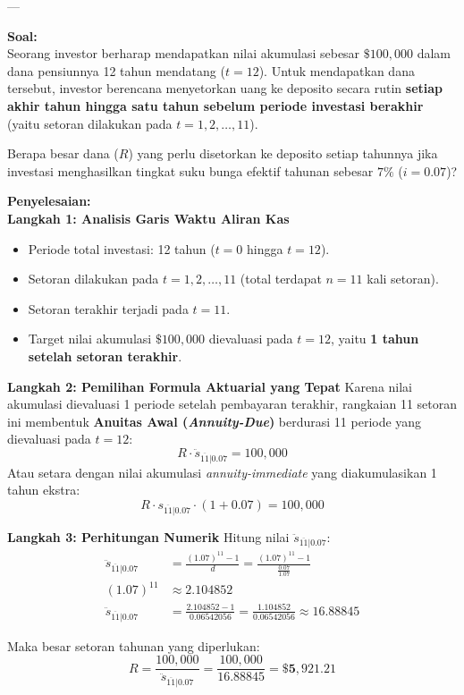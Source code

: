 \documentclass[11pt,a4paper]{article}
\begin{document}
---

\begin{examplebox}
\textbf{Soal:}\\
Seorang investor berharap mendapatkan nilai akumulasi sebesar $\$100{,}000$ dalam dana pensiunnya 12 tahun mendatang ($t = 12$). Untuk mendapatkan dana tersebut, investor berencana menyetorkan uang ke deposito secara rutin \textbf{setiap akhir tahun hingga satu tahun sebelum periode investasi berakhir} (yaitu setoran dilakukan pada $t = 1, 2, \dots, 11$).

Berapa besar dana ($R$) yang perlu disetorkan ke deposito setiap tahunnya jika investasi menghasilkan tingkat suku bunga efektif tahunan sebesar $7\%$ ($i = 0.07$)?

\vspace{0.5em}
\textbf{Penyelesaian:}\\
\textbf{Langkah 1: Analisis Garis Waktu Aliran Kas}
\begin{itemize}
    \item Periode total investasi: 12 tahun ($t = 0$ hingga $t = 12$).
    \item Setoran dilakukan pada $t = 1, 2, \dots, 11$ (total terdapat $n = 11$ kali setoran).
    \item Setoran terakhir terjadi pada $t = 11$.
    \item Target nilai akumulasi $\$100{,}000$ dievaluasi pada $t = 12$, yaitu \textbf{1 tahun setelah setoran terakhir}.
\end{itemize}

\textbf{Langkah 2: Pemilihan Formula Aktuarial yang Tepat}
Karena nilai akumulasi dievaluasi 1 periode setelah pembayaran terakhir, rangkaian 11 setoran ini membentuk \textbf{Anuitas Awal (\textit{Annuity-Due})} berdurasi 11 periode yang dievaluasi pada $t = 12$:
\begin{equation*}
    R \cdot \ddot{s}_{\overline{11}|0.07} = 100{,}000
\end{equation*}
Atau setara dengan nilai akumulasi \textit{annuity-immediate} yang diakumulasikan 1 tahun ekstra:
\begin{equation*}
    R \cdot s_{\overline{11}|0.07} \cdot (1 + 0.07) = 100{,}000
\end{equation*}

\textbf{Langkah 3: Perhitungan Numerik}
Hitung nilai $\ddot{s}_{\overline{11}|0.07}$:
\begin{align*}
    \ddot{s}_{\overline{11}|0.07} &= \frac{(1.07)^{11} - 1}{d} = \frac{(1.07)^{11} - 1}{\frac{0.07}{1.07}} \\[0.4em]
    (1.07)^{11} &\approx 2.104852 \\
    \ddot{s}_{\overline{11}|0.07} &= \frac{2.104852 - 1}{0.06542056} = \frac{1.104852}{0.06542056} \approx 16.88845
\end{align*}

Maka besar setoran tahunan yang diperlukan:
\begin{equation*}
    R = \frac{100{,}000}{\ddot{s}_{\overline{11}|0.07}} = \frac{100{,}000}{16.88845} = \mathbf{\$5{,}921.21}
\end{equation*}
\end{examplebox}
\end{document}
